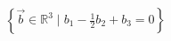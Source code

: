 \documentclass[preview]{standalone}
\begin{document}
\begin{align*}
\left\{ \vec{b} \in \mathbb{R}^3 \mid b_1 - \frac{1}{2}b_2 + b_3 = 0\right\}
\end{align*}
\end{document}
